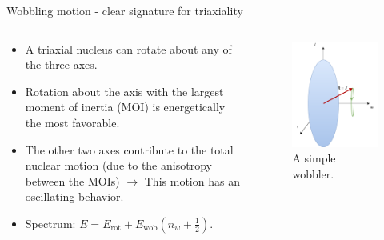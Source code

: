 \documentclass{beamer}
\begin{document}
\begin{frame}{Wobbling motion  - clear signature for triaxiality}
\begin{columns}
\begin{column}{0.6\textwidth}
  \begin{itemize}
    \item A triaxial nucleus can rotate about any of the three axes.
    \item Rotation about the axis with the largest moment of inertia (MOI) is energetically the most favorable.
    \item The other two axes contribute to the total nuclear motion (due to the anisotropy between the MOIs) $\to$ {\color{red}This motion has an oscillating behavior}. 
    \item Spectrum: $E=E_\text{rot}+E_\text{wob}\left(n_w+\frac{1}{2}\right)$.
  \end{itemize}
\end{column}
\begin{column}{0.4\textwidth}
\begin{figure}
    \centering
      \includegraphics[scale=0.5]{figs/simpleWobbler.pdf}
      \caption{A simple wobbler.}
  \end{figure}
\end{column}
\end{columns}
\end{frame}
\end{document}
